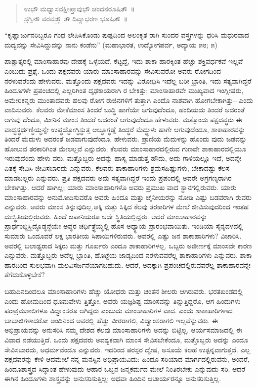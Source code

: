 \begin{verse}
ಉಭೌ ಮಧ್ವಾಸವಕ್ಷೀಪ್ತಾವುಭೌ ಚಂದನರೂಷಿತೌ~॥\\ಸ್ರಗ್ವಿನೌ ವರವಸ್ತ್ರೌ ತೌ ದಿವ್ಯಾಭರಣ ಭೂಷಿತೌ~॥
\end{verse}

“ಕೃಷ್ಣಾರ್ಜುನರಿಬ್ಬರೂ ಗಂಧ ಲೇಪಿಸಿಕೊಂಡು ಪುಷ್ಪದಿಂದ ಅಲಂಕೃತ ರಾಗಿ ಸುಂದರ ವಸ್ತ್ರಗಳನ್ನು ಧರಿಸಿ ಮಧುರವಾದ ಮದ್ಯವನ್ನು ಸೇವಿಸಿದ್ದುದನ್ನು ನಾನು ಕಂಡೆನು” (ಮಹಾಭಾರತ, ಉದ್ಯೋಗಪರ್ವ, ಅದ್ಯಾಯ ೫೮; ೫)

ಪಾಶ್ಚಾತ್ಯರಲ್ಲಿ ಮಾಂಸಾಹಾರವು ದೇಹಕ್ಕೆ ಒಳ್ಳೆಯದೆ, ಕೆಟ್ಟದ್ದೆ, ಇದು ಶಾಕಾ ಹಾರಕ್ಕಿಂತ ಹೆಚ್ಚು ಶಕ್ತಿವರ್ಧಕವೆ ಇಲ್ಲವೆ ಎಂಬುದು ಪ್ರಶ್ನೆ. ಒಂದು ಪಕ್ಷದವರು ಯಾರು ಮಾಂಸಾಹಾರವನ್ನು ಸೇವಿಸುವರೋ ಅವರು ರೋಗದಿಂದ ನರಳುವರೆಂದು ಹೇಳುವರು. ಮತ್ತೊಂದು ಪಕ್ಷದವರು ಇದನ್ನು ವಿರೋಧಿಸಿ ಇದೆಲ್ಲ ಬರೀ ಭ್ರಾಂತಿ, ಇದು ಸತ್ಯವಾಗಿದ್ದರೆ ಹಿಂದೂಗಳೇ ಪ್ರಪಂಚದಲ್ಲಿ ಎಲ್ಲರಿಗಿಂತ ದೃಢಕಾಯರಾಗಿ ರ ಬೇಕಿತ್ತು; ಮಾಂಸಾಹಾರವೇ ಮುಖ್ಯವಾದ ಇಂಗ್ಲೀಷರು, ಅಮೇರಿಕನ್ನರು ಮುಂತಾದವರು ಹಲವು ರೋಗ ರುಜಿನಗಳಿಗೆ ತುತ್ತಾಗಿ ಎಂದೊ ನಾಶವಾಗಿ ಹೋಗಬೇಕಾಗಿತ್ತು– ಎಂದು ವಾದಿಸುವರು. ಕೆಲವರು ಮೇಕೆಮಾಂಸ ತಿಂದರೆ ಬುದ್ಧಿ ಹಾಗೆಯೇ ಆಗುವುದೆಂದೂ, ಹಂದಿಯದು ತಿಂದರೆ ಅದರಂತೆ ಆಗುವು ದೆಂದೂ, ಮೀನಿನ ಮಾಂಸ ತಿಂದರೆ ಅದರಂತೆ ಆಗುವುದೆಂದೂ ಹೇಳುವರು. ಮತ್ತೊಂದು ಪಕ್ಷದವ್ಧರು ಈ ವಾದ್ಧಸ್ಧರ್ಧಣ್ಧಿಯ್ಧನ್ನೇ ಉಪ್ಧಯ್ಧೋಗ್ಧಿಸ್ಧುತ್ತ ಆಲ್ಧೂಗ್ಧಡ್ಡೆ ತಿಂದ್ಧರೆ ಮೆದ್ಧ್ಧುಳು ಹಾಗೇ ಆಗುವುದೆಂದೂ, ಶಾಕಾಹಾರವನ್ನು ತಿಂದರೆ ಮೆದುಳು ಅದರಂತೆ ಜಡವಾಗುವುದೆಂದೂ, ಹೇಳುವರು. ಪ್ರಾಣಿಯ ಮೆದುಳನ್ನು ಹೊಂದು ವುದು ಜಡವನ್ನು ಹೋಲುವ ತರಕಾರಿಗಿಂತ ಮೇಲಲ್ಲವೆ ಎನ್ನುವರು. ಕೆಲವರು ಮಾಂಸಾಹಾರದಲ್ಲಿರುವ ಗುಣವೇ ಶಾಕಾಹಾರದಲ್ಲಿಯೂ ಇರುವುದೆಂದು ಹೇಳು ವರು. ಮತ್ತೊಬ್ಬರು ಅದನ್ನು ಹಾಸ್ಯ ಮಾಡುತ್ತ ಹೌದು, ಅದು ಗಾಳಿಯಲ್ಲೂ ಇದೆ, ಅದನ್ನೇ ಏತಕ್ಕೆ ಸೇವಿಸಿ ಜೀವಿಸಬಾರದು ಎನ್ನುವರು. ಕೆಲವರು ಶಾಕಾಹಾರಿಗಳು ಶ್ರಮಸಹಿಷ್ಣುಗಳು, ಬೇಕಾದಷ್ಟು ಕೆಲಸ ಮಾಡಬಲ್ಲರು ಎನ್ನುವರು. ಪ್ರತಿ ಪಕ್ಷದವರು ಅದು ಸತ್ಯವಾಗಿದ್ದರೆ ಇಂದು ಪ್ರಪಂದಲ್ಲಿ ಅವರೇ ಅಗ್ರಗಣ್ಯರಾಗಿರ ಬೇಕಾಗಿತ್ತು. ಆದರೆ ಹಾಗಿಲ್ಲ; ಯಾರು ಮಾಂಸಾಹಾರಿಗಳೊ ಅವರು ಪ್ರಮುಖ ವಾದ ಸ್ಥಾನಗಲ್ಲಿರುವರು. ಯಾರು ಮಾಂಸಾಹಾರವನ್ನು ಅನುಮೋದಿಸುವರೊ ಅವರು ಹಿಂದೂ ಮತ್ತು ಚೈನೀಯರನ್ನು ನೋಡಿ ಎಷ್ಟು ಬಡವರಾಗಿ ರುವರು ಎನ್ನುವರು. ಅವರು ಮಾಂಸ ತಿನ್ನುವುದಿಲ್ಲ.ಅಕ್ಕಿ ಮತ್ತು ಸಿಕ್ಕಿದ ಕೆಲವು ತರಕಾರಿಗಳ ಮೇಲೆ ಜೀವಿಸುವುದರಿಂದ ಇಂತಹ ದುಃಸ್ಥಿತಿಯಲ್ಲಿರುವರು. ಹಿಂದೆ ಜಪಾನಿಯರೂ ಅದೇ ಸ್ಥಿತಿಯಲ್ಲಿದ್ದರು. ಆದರೆ ಮಾಂಸಾಹಾರವನ್ನು ಪ್ರಾರ್ಧಂಭ್ಧಿಸ್ಧಿದ್ಧೊಡ್ಧನ್ಧೆಯೇ ಅವ್ಧರ ಚರ್ಧಿತ್ರ್ಧೆಯ್ಧಲ್ಲಿ ಹೊಸ ಅಧ್ಯ್ಧಾಯ ಪ್ರಾರಂಭವಾಯಿತು. ಇಂಡಿಯಾ ಸೈನ್ಯದಳದಲ್ಲಿ ಸುಮಾರು ಒಂದೂವರೆ ಲಕ್ಷ ಭಾರತೀಯ ಸಿಪಾಯಿಗಳಿರುವರು. ಅವರಲ್ಲಿ ಎಷ್ಟು ಜನ ಶಾಕಾಹಾರಿಗಳು? ವಿಚಾರಿಸಿ. ಅವರಲ್ಲಿ ಬಲಾಢ್ಯರಾದ ಸಿಕ್ಕರು ಮತ್ತು ಗೂರ್ಖರು ಎಂದೂ ಶಾಕಾಹಾರಿಗಳಲ್ಲ. ಒಬ್ಬರು ಅಜೀರ್ಣಕ್ಕೆ ಮಾಂಸವೇ ಕಾರಣ ಎನ್ನುವರು. ಮತ್ತೊಬ್ಬರು ಅದೆಲ್ಲ ಭ್ರಾಂತಿ, ಹೊಟ್ಟೆಯ ಜಾಡ್ಯದಿಂದ ನರಳುವವರೆಲ್ಲ ಶಾಕಾಹಾರಿಗಳು ಎನ್ನುವರು. ಶಾಕಾ ಹಾರದಿಂದ ಸುಲಭವಾಗಿ ಮಲವಿಸರ್ಜನೆಯಾಗಬಹುದು. ಆದರೆ, ಅದಕ್ಕಾಗಿ ಪ್ರಪಂಚದಲ್ಲಿರುವವರೆಲ್ಲ ಶಾಕಾಹಾರವನ್ನೇ ತೆಗೆದುಕೊಳ್ಳಬೇಕೆ?

ಬಹುದಿನದಿಂದಲೂ ಮಾಂಸಾಹಾರಿಗಳು ಹೆಚ್ಚು ಯೋಧರು ಮತ್ತು ಚಿಂತನ ಶೀಲರು ಆಗಿರುವರು. ಭರತಖಂಡದಲ್ಲಿ ಎಂದು ಹೋಮದಿಂದ ಧೂಮವೇಳು ತ್ತಿತ್ತೋ, ಅವರು ಯಜ್ಞಶಿಷ್ಟ ಮಾಂಸವನ್ನು ತಿನ್ನುತ್ತಿದ್ದರೊ, ಆಗ ಹಿಂದುಗಳು ಪರಾಕ್ರಮಶಾಲಿಗಳೂ ವಿದ್ವಾಂಸರೂ ಆಗಿದ್ದರು ಎಂಬುದು ಮಾಂಸಾಹಾರಿಗಳ ವಾದ. ಎಂದು ಶಾಕಾಹಾರಿಗಳಾದ ಬಾಬಾಜಿಗಳಾದರೋ ಅಂದಿನಿಂದ ಅವರಲ್ಲಿ ಹೆಚ್ಚು ವೀರರಾಗಲಿ, ವಿದ್ವಾಂಸರಾಗಲಿ ಇಲ್ಲವೆನ್ನುವರು. ಈ ಅಭಿಪ್ರಾಯವನ್ನು ಅನುಸರಿಸಿ ನಮ್ಮ ದೇಶದ ಕೆಲವು ಮಾಂಸಾಹಾರಿಗಳು ಅದನ್ನು ಬಿಟ್ಟಿಲ್ಲ. ಆರ್ಯಸಮಾಜದಲ್ಲಿ ಈ ವಿವಾದ ನಡೆಯುತ್ತಿದೆ. ಒಂದು ಪಕ್ಷದವರು ಅವಶ್ಯಕವಾಗಿ ಮಾಂಸ ಸೇವಿಸಬೇಕೆಂದೂ, ಮತ್ತೊಬ್ಬರು ಅದನ್ನು ಎಂದೂ ಸೇವಿಸಬಾರದು, ಅಧರ್ಮವೆಂದೂ ಎನ್ನುವರು. ಇದರಿಂದ ಪರಸ್ಪರ ದ್ವೇಷ, ಅಸೂಯೆ ಕಲಹ ಉತ್ಪನ್ನವಾಗುತ್ತದೆ. ಎಲ್ಲ ಪಕ್ಷದವರನ್ನು ಕೇಳಿ ಆದಮೇಲೆ ನನ್ನ ಮನಸ್ಸಿನ ಅಭಿಪ್ರಾಯವಿದು: ಹಿಂದೂ ಸರಿಯಾದ ಮಾರ್ಗದಲ್ಲಿರುವನು, ಅಂದರೆ, ಹಿಂದೂಶಾಸ್ತ್ರದ ಸಿದ್ಧಾಂತ ಹೇಳುವುದು ಆಹಾರ ಒಬ್ಬನ ಜನ್ಮಕರ್ಮದ ಮೇಲೆ ನಿಂತಿರಬೇಕು ಎನ್ನುವುದು ಸರಿ. ಆದರೆ ಈಗಿನ ಹಿಂದೂಗಳು ಶಾಸ್ತ್ರವನ್ನು ಅನುಸರಿಸುತ್ತಿಲ್ಲ; ಅಥವಾ ಹಿಂದಿನ ಆಚಾರ್ಯರನ್ನೂ ಅನುಸರಿಸುತ್ತಿಲ್ಲ.

